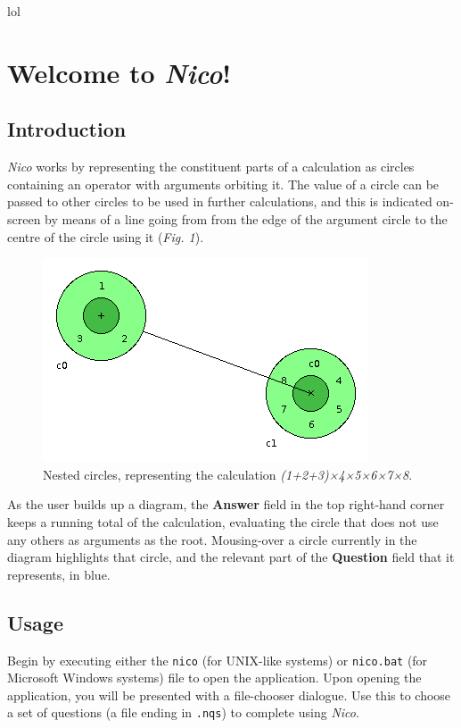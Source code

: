 \documentclass[14pt]{article}
\begin{document}
lol

\section*{Welcome to \emph{Nico}!}

\subsection*{Introduction}

\emph{Nico} works by representing the constituent parts of a calculation as
circles containing an operator with arguments orbiting it.  The value of a circle
can be passed to other circles to be used in further calculations, and this is
indicated on-screen by means of a line going from from the edge of the argument
circle to the centre of the circle using it (\emph{Fig. 1}).

\begin{figure}[htb]
\centering
\includegraphics[scale=0.75]{fig1.png}
\caption{Nested circles, representing the calculation \emph{(1+2+3)×4×5×6×7×8}.}
\end{figure}

As the user builds up a diagram, the {\bf {\sffamily Answer}} field in the top
right-hand corner keeps a running total of the calculation, evaluating the circle
that does not use any others as arguments as the root.  Mousing-over a circle
currently in the diagram highlights that circle, and the relevant part of the
{\bf {\sffamily Question}} field that it represents, in blue.

\subsection*{Usage}

Begin by executing either the \verb¬nico¬ (for UNIX-like systems) or
\verb¬nico.bat¬ (for Microsoft Windows systems) file to open the application.
Upon opening the application, you will be presented with a file-chooser dialogue.
Use this to choose a set of questions (a file ending in \verb¬.nqs¬) to complete
using \emph{Nico}.
\end{document}
